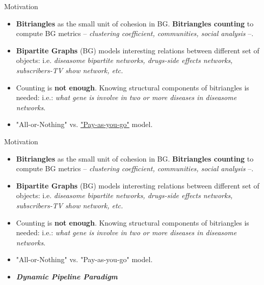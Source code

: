 \begin{frame}[fragile]{Motivation}
  \begin{itemize}
    \setlength\itemsep{2em}
    \item {\color{light}\textbf{Bitriangles} as the small unit of cohesion in BG. \textbf{Bitriangles counting} to compute BG metrics -- \emph{clustering coefficient, communities, social analysis} --.}
    \item {\color{light}\textbf{Bipartite Graphs} (BG) models interesting relations between different set of objects: i.e. \emph{diseasome bipartite networks, drugs-side effects networks, subscribers-TV show network, etc.}}
    \item {\color{light}Counting is \textbf{not enough}. Knowing structural components of bitriangles is needed: i.e.: \emph{what gene is involve in two or more diseases in diseasome networks}.}
    \item "All-or-Nothing" vs. \underline{\color{red}"Pay-as-you-go"} model. 
\end{itemize}
\end{frame}

\begin{frame}[fragile]{Motivation}
  \begin{itemize}
    \setlength\itemsep{1.5em}
    \item {\color{light}\textbf{Bitriangles} as the small unit of cohesion in BG. \textbf{Bitriangles counting} to compute BG metrics -- \emph{clustering coefficient, communities, social analysis} --.}
    \item {\color{light}\textbf{Bipartite Graphs} (BG) models interesting relations between different set of objects: i.e. \emph{diseasome bipartite networks, drugs-side effects networks, subscribers-TV show network, etc.}}
    \item {\color{light}Counting is \textbf{not enough}. Knowing structural components of bitriangles is needed: i.e.: \emph{what gene is involve in two or more diseases in diseasome networks}.}
    \item {\color{light}"All-or-Nothing" vs. "Pay-as-you-go" model.}
    \item \textbf{\emph{Dynamic Pipeline Paradigm}}
\end{itemize}
\end{frame}

